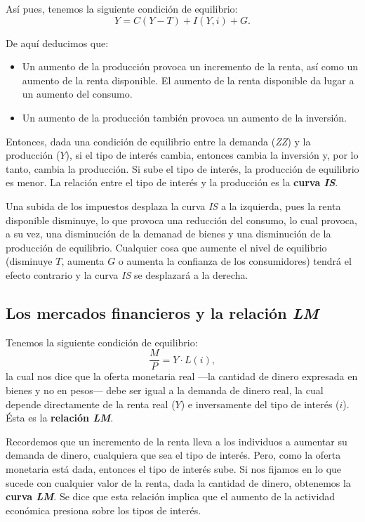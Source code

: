 \documentclass[10pt, landscape]{article}
\begin{document}
\begin{multicols*}{3}
Así pues, tenemos la siguiente condición de equilibrio:
\[ Y = C(Y-T) + I(Y,i) + G. \]

De aquí deducimos que:
\begin{itemize}
    \item Un aumento de la producción provoca un incremento de la renta, así como un aumento de la renta disponible. El aumento de la renta disponible da lugar a un aumento del consumo.
    \item Un aumento de la producción también provoca un aumento de la inversión.
\end{itemize}

Entonces, dada una condición de equilibrio entre la demanda (\textit{ZZ}) y la producción ($Y$), si el tipo de interés cambia, entonces cambia la inversión y, por lo tanto, cambia la producción. Si sube el tipo de interés, la producción de equilibrio es menor. La relación entre el tipo de interés y la producción es la \textbf{curva \textit{IS}}.

Una subida de los impuestos desplaza la curva \textit{IS} a la izquierda, pues la renta disponible disminuye, lo que provoca una reducción del consumo, lo cual provoca, a su vez, una disminución de la demanad de bienes y una disminución de la producción de equilibrio. Cualquier cosa que aumente el nivel de equilibrio (disminuye $T$, aumenta $G$ o aumenta la confianza de los consumidores) tendrá el efecto contrario y la curva \textit{IS} se desplazará a la derecha.

\subsection{Los mercados financieros y la relación \textit{LM}}
Tenemos la siguiente condición de equilibrio:
\[ \frac{M}{P} = Y \cdot L(i), \]
la cual nos dice que la oferta monetaria real ---la cantidad de dinero expresada en bienes y no en pesos--- debe ser igual a la demanda de dinero real, la cual depende directamente de la renta real ($Y$) e inversamente del tipo de interés ($i$). Ésta es la \textbf{relación \textit{LM}}.

Recordemos que un incremento de la renta lleva a los individuos a aumentar su demanda de dinero, cualquiera que sea el tipo de interés. Pero, como la oferta monetaria está dada, entonces el tipo de interés sube. Si nos fijamos en lo que sucede con cualquier valor de la renta, dada la cantidad de dinero, obtenemos la \textbf{curva \textit{LM}}. Se dice que esta relación implica que el aumento de la actividad económica presiona sobre los tipos de interés.


\end{multicols*}
\end{document}

